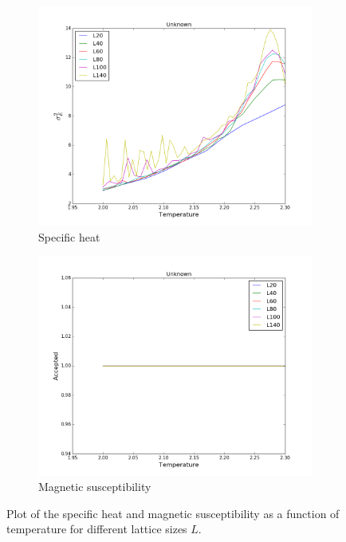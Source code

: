 \documentclass{article}
\begin{document}
\begin{figure}[H]
  \centering
  \begin{subfigure}{0.49\textwidth}
    \includegraphics[scale=0.29]{../figures/task_e/sigmaE.png}
    \caption{Specific heat}
  \end{subfigure}
  \begin{subfigure}{0.49\textwidth}
    \includegraphics[scale=0.29]{../figures/task_e/accepted.png}
    \caption{Magnetic susceptibility}
  \end{subfigure}
  \caption{Plot of the specific heat and magnetic susceptibility as a function of temperature for different lattice sizes $L$.}
  \label{fig:harold}
\end{figure}
\end{document}
